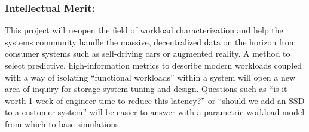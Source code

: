 \subsubsection*{Intellectual Merit: }



This project will re-open the field of workload characterization and help the systems community handle the massive,
decentralized data on the horizon from consumer systems such as self-driving
cars or augmented reality.
A method to select predictive, high-information metrics to describe modern
workloads coupled with a way of isolating ``functional workloads'' within a
system will open a new area of inquiry for storage system tuning and design.
Questions such as ``is it worth 1 week of engineer time to reduce this
latency?'' or ``should we add an SSD to a customer system'' will be easier to
answer with a parametric workload model from which to base simulations.

%



